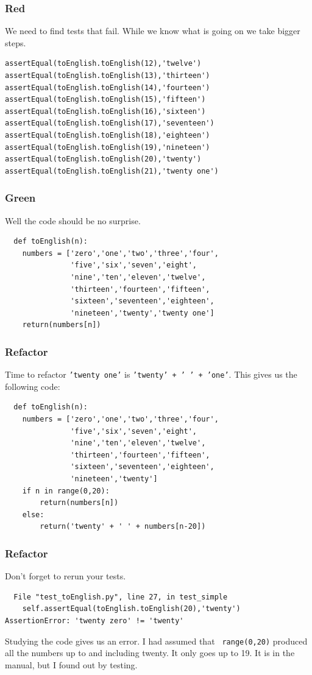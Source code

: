 \documentclass{beamer}
\begin{document}
\begin{frame}[fragile]
\frametitle{Red}
We need to find tests that fail. While we know what is going on we
take bigger steps. 
\begin{lstlisting}
assertEqual(toEnglish.toEnglish(12),'twelve')	
assertEqual(toEnglish.toEnglish(13),'thirteen')	
assertEqual(toEnglish.toEnglish(14),'fourteen')
assertEqual(toEnglish.toEnglish(15),'fifteen')
assertEqual(toEnglish.toEnglish(16),'sixteen')
assertEqual(toEnglish.toEnglish(17),'seventeen')
assertEqual(toEnglish.toEnglish(18),'eighteen')
assertEqual(toEnglish.toEnglish(19),'nineteen')
assertEqual(toEnglish.toEnglish(20),'twenty')
assertEqual(toEnglish.toEnglish(21),'twenty one')
\end{lstlisting}
\end{frame}
\begin{frame}[fragile]
\frametitle{Green}
Well the code should be no surprise.
\begin{lstlisting}
  def toEnglish(n):
    numbers = ['zero','one','two','three','four',
               'five','six','seven','eight',
               'nine','ten','eleven','twelve',
               'thirteen','fourteen','fifteen',
               'sixteen','seventeen','eighteen',
               'nineteen','twenty','twenty one']
    return(numbers[n])
\end{lstlisting}
\end{frame}
\begin{frame}[fragile]
\frametitle{Refactor}
  Time to refactor {\tt 'twenty one'} 
 is {\tt 'twenty' + ' ' + 'one'}. This gives us the  following code:
\begin{lstlisting}
  def toEnglish(n):
    numbers = ['zero','one','two','three','four',
               'five','six','seven','eight',
               'nine','ten','eleven','twelve',
               'thirteen','fourteen','fifteen',
               'sixteen','seventeen','eighteen',
               'nineteen','twenty']
    if n in range(0,20):
        return(numbers[n])
    else:
        return('twenty' + ' ' + numbers[n-20])
\end{lstlisting}
\end{frame}
\begin{frame}[fragile]
\frametitle{Refactor}
  Don't forget to rerun your tests.
\begin{verbatim}
  File "test_toEnglish.py", line 27, in test_simple
    self.assertEqual(toEnglish.toEnglish(20),'twenty')
AssertionError: 'twenty zero' != 'twenty'
\end{verbatim}
Studying the code gives us an error. I had assumed that {\tt
  range(0,20)} produced all the numbers up to and including twenty. It
only goes up to 19. It is in the manual, but I found out by
testing.
\end{frame}
\end{document}
